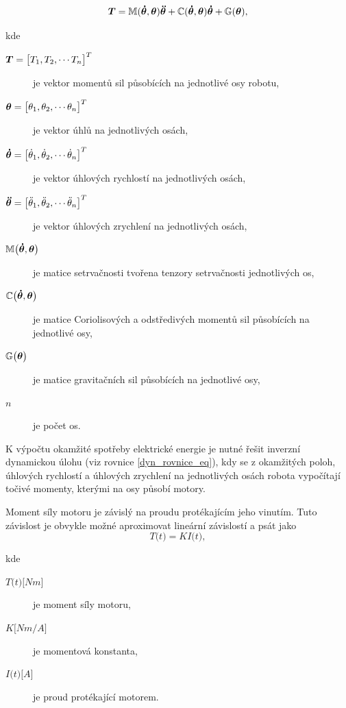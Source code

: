 \begin{equation}
\boldsymbol{T} = \mathbb{M}(\boldsymbol{\dot{\theta}},\boldsymbol{\theta})\boldsymbol{\ddot{\theta}} + \mathbb{C}(\boldsymbol{\dot{\theta}},\boldsymbol{\theta})\boldsymbol{\dot{\theta}} + \mathbb{G}(\boldsymbol{\theta}),
\label{dyn_rovnice_eq}
\end{equation}

kde

\begin{description}
\item[$\boldsymbol{T} = {\big[T_1, T_2,  \dotsm  T_n\big]}^{T}$] je vektor momentů sil působících na jednotlivé osy robotu,
\item[$\boldsymbol{\theta} = {\big[\theta_1, \theta_2, \dotsm \theta_n\big]}^{T}$] je vektor úhlů na jednotlivých osách,
\item[$\boldsymbol{\dot\theta} = {\big[\dot \theta_1, \dot \theta_2,  \dotsm  \dot \theta_n\big]}^{T}$] je vektor úhlových rychlostí na jednotlivých osách,
\item[$\boldsymbol{\ddot\theta} = {\big[\ddot \theta_1, \ddot \theta_2,  \dotsm  \ddot \theta_n\big]}^{T}$] je vektor úhlových zrychlení na jednotlivých osách,
\item[$\mathbb{M}\big(\boldsymbol{\dot\theta}, \boldsymbol{\theta}\big)$] je matice setrvačnosti tvořena tenzory setrvačnosti jednotlivých os,
\item[$\mathbb{C}\big(\boldsymbol{\dot\theta}, \boldsymbol{\theta}\big)$] je matice Coriolisových a odstředivých momentů sil působících na jednotlivé osy,
\item[$\mathbb{G}\big(\boldsymbol{\theta}\big)$] je matice gravitačních sil působících na jednotlivé osy,
\item[$n$] je počet os.
\end{description}

K výpočtu okamžité spotřeby elektrické energie je nutné řešit inverzní dynamickou úlohu (viz rovnice \eqref{dyn_rovnice_eq}), kdy se z okamžitých poloh, úhlových rychlostí a úhlových zrychlení na jednotlivých osách robota vypočítají točivé momenty, kterými na osy působí motory. 

Moment síly motoru je závislý na proudu protékajícím jeho vinutím. Tuto závislost je obvykle možné aproximovat lineární závislostí \cite{sbornik} a psát jako
\begin{equation}
T\big(t\big) = KI\big(t\big),
\label{torque_current_eq}
\end{equation}

kde

\begin{description}
\item[$T\big(t\big) {\big[Nm\big]}$] je moment síly motoru, 
\item[$K {\big[Nm/A\big]}$] je momentová konstanta, 
\item[$I\big(t\big) {\big[A\big]}$] je proud protékající motorem. 
\end{description}

